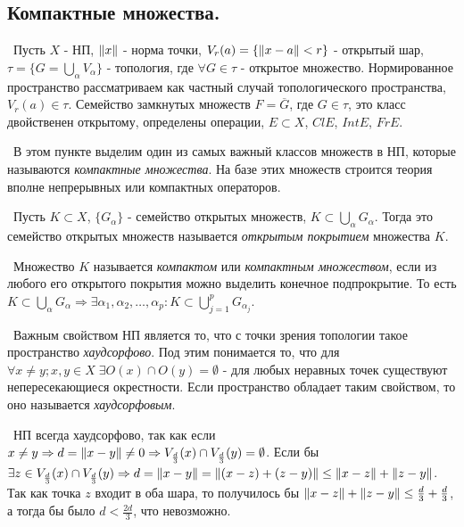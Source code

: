 \subsection*{Компактные множества.}

\noindent\textbullet~Пусть $X$ - НП, $\left\lVert x\right\rVert$ - норма точки, $V_r(a) = \{ \left\lVert x - a\right\rVert < r \}$ - открытый шар, $\tau = \{ G = \bigcup\limits_\alpha V_\alpha\}$
- топология, где $\forall G \in \tau$ - открытое множество. Нормированное пространство рассматриваем как частный случай топологического пространства, $V_r(a) \in \tau$.
Семейство замкнутых множеств $F = \overline{G}$, где $G \in \tau$, это класс двойственен открытому, определены операции, $E \subset X$, $Cl E$, $Int E$, $Fr E$.

\smallskip
\noindent\textbullet~В этом пункте выделим один из самых важный классов множеств в НП, которые называются \textit{компактные множества}. На базе этих множеств строится
теория вполне непрерывных или компактных операторов.

\medskip
\noindent\textasteriskcentered~Пусть $K \subset X$, $\{ G_\alpha\}$ - семейство открытых множеств, $K \subset \bigcup_\alpha G_\alpha$. Тогда это семейство 
открытых множеств называется \textit{открытым покрытием} множества $K$.

\smallskip 
\noindent\textasteriskcentered~Множество $K$ называется \textit{компактом} или \textit{компактным множеством}, если из любого его открытого покрытия можно выделить 
конечное подпрокрытие. То есть $K \subset \bigcup_\alpha G_\alpha \Rightarrow \exists \alpha_1, \alpha_2, \dots, \alpha_p : K \subset \bigcup_{j = 1}^p G_{\alpha_j}$.

\medskip 
\noindent\textasteriskcentered~Важным свойством НП является то, что с точки зрения топологии такое пространство \textit{хаудсорфово}. Под этим понимается то, что для $\forall x
\neq y; x, y \in X \; \exists O(x) \cap O(y) = \emptyset$ - для любых неравных точек существуют непересекающиеся окрестности. Если пространство обладает таким свойством,
то оно называется \textit{хаудсорфовым}.

\smallskip 
\noindent\textbullet~НП всегда хаудсорфово, так как если $x \neq y \Rightarrow d = \left\lVert x - y\right\rVert \neq 0 \Rightarrow V_{\frac{d}{3}}(x) \cap V_{\frac{d}{3}}(y) = \emptyset$.
Если бы $\exists z \in V_{\frac{d}{3}}(x) \cap V_{\frac{d}{3}}(y) \Rightarrow d = \left\lVert x - y\right\rVert = \left\lVert(x - z) + (z - y)\right\rVert \le \left\lVert x - z\right\rVert + \left\lVert z - y\right\rVert$. Так как 
точка $z$ входит в оба шара, то получилось бы $\left\lVert x - z\right\rVert + \left\lVert z - y\right\rVert \le \frac{d}{3} + \frac{d}{3}$, а тогда бы было $d < \frac{2d}{3}$, что невозможно.

